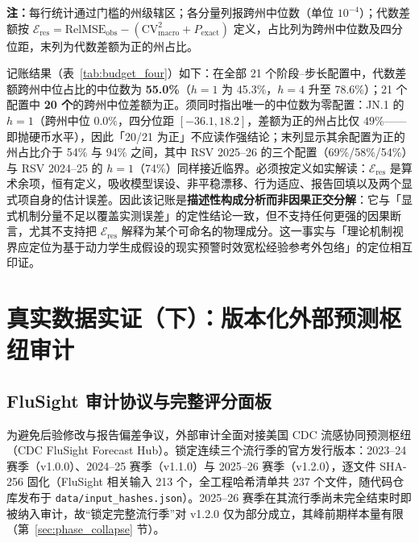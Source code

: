 \documentclass[10pt,UTF8,a4paper,zihao=-4]{ctexart}
\theoremstyle{plain}
\theoremstyle{remark}
\begin{document}
\begin{table}[htbp]
\centering
\footnotesize
\caption{两项显式模型分量与模型--观测代数差额的描述性误差记账州级分解}
\label{tab:budget_four}
\setlength{\tabcolsep}{3pt}

\vspace{2pt}
\begin{flushleft}
\scriptsize \textbf{注：}每行统计通过门槛的州级辖区；各分量列报跨州中位数（单位 $10^{-4}$）；代数差额按 $\mathcal{E}_{\text{res}} = \text{RelMSE}_{\text{obs}} - (\text{CV}^2_{\text{macro}} + P_{\text{exact}})$ 定义，占比列为跨州中位数及四分位距，末列为代数差额为正的州占比。
\end{flushleft}
\end{table}

记账结果（表~\ref{tab:budget_four}）如下：在全部 21 个阶段--步长配置中，代数差额跨州中位占比的中位数为 \textbf{55.0\%}（$h=1$ 为 45.3\%，$h=4$ 升至 78.6\%）；21 个配置中 \textbf{20 个}的跨州中位差额为正。须同时指出唯一的中位数为零配置：JN.1 的 $h=1$（跨州中位 $0.0\%$，四分位距 $[-36.1, 18.2]$，差额为正的州占比仅 $49\%$——即抛硬币水平），因此「20/21 为正」不应读作强结论；末列显示其余配置为正的州占比介于 54\% 与 94\% 之间，其中 RSV 2025--26 的三个配置（69\%/58\%/54\%）与 RSV 2024--25 的 $h=1$（74\%）同样接近临界。必须按定义如实解读：$\mathcal{E}_{\text{res}}$ 是算术余项，恒有定义，吸收模型误设、非平稳漂移、行为适应、报告回填以及两个显式项自身的估计误差。因此该记账是\textbf{描述性构成分析而非因果正交分解}：它与「显式机制分量不足以覆盖实测误差」的定性结论一致，但不支持任何更强的因果断言，尤其不支持把 $\mathcal{E}_{\text{res}}$ 解释为某个可命名的物理成分。这一事实与「理论机制视界应定位为基于动力学生成假设的现实预警时效宽松经验参考外包络」的定位相互印证。

\section{真实数据实证（下）：版本化外部预测枢纽审计}\label{sec:hub_audit}

\subsection{FluSight 审计协议与完整评分面板}\label{sec:flusight_scores}

为避免后验修改与报告偏差争议，外部审计全面对接美国 CDC 流感协同预测枢纽（CDC FluSight Forecast Hub）\citep{flusight2024evaluation}。锁定连续三个流行季的官方发行版本：2023--24 赛季（v1.0.0）、2024--25 赛季（v1.1.0）与 2025--26 赛季（v1.2.0），逐文件 SHA-256 固化（FluSight 相关输入 213 个，全工程哈希清单共 237 个文件，随代码仓库发布于 \texttt{data/input\_hashes.json}）。2025--26 赛季在其流行季尚未完全结束时即被纳入审计，故“锁定完整流行季”对 v1.2.0 仅为部分成立，其峰前期样本量有限（第~\ref{sec:phase_collapse} 节）。
\end{document}
